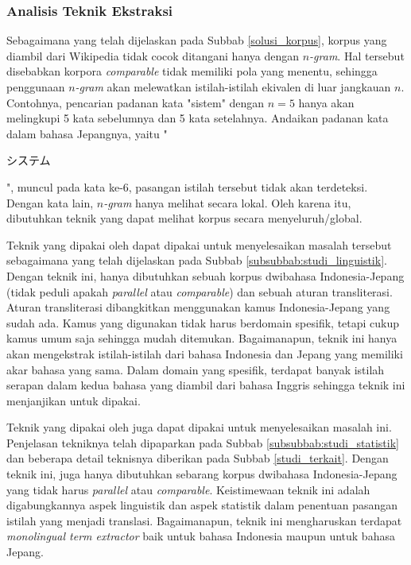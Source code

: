 \documentclass[../main/main.tex]{subfiles}
\begin{document}
\subsubsection{Analisis Teknik Ekstraksi}
Sebagaimana yang telah dijelaskan pada Subbab \ref{solusi_korpus}, korpus yang diambil dari Wikipedia tidak cocok ditangani hanya dengan \textit{$n$-gram}. Hal tersebut disebabkan korpora \textit{comparable} tidak memiliki pola yang menentu, sehingga penggunaan \textit{$n$-gram} akan melewatkan istilah-istilah ekivalen di luar jangkauan $n$. Contohnya, pencarian padanan kata "sistem" dengan $n=5$ hanya akan melingkupi 5 kata sebelumnya dan 5 kata setelahnya. Andaikan padanan kata dalam bahasa Jepangnya, yaitu "\begin{CJK}{UTF8}{min}システム\end{CJK}", muncul pada kata ke-6, pasangan istilah tersebut tidak akan terdeteksi. Dengan kata lain, \textit{$n$-gram} hanya melihat secara lokal. Oleh karena itu, dibutuhkan teknik yang dapat melihat korpus secara menyeluruh/global.

Teknik yang dipakai oleh \textcite{tsuji} dapat dipakai untuk menyelesaikan masalah tersebut sebagaimana yang telah dijelaskan pada Subbab \ref{subsubbab:studi_linguistik}. Dengan teknik ini, hanya dibutuhkan sebuah korpus dwibahasa Indonesia-Jepang (tidak peduli apakah \textit{parallel} atau \textit{comparable}) dan sebuah aturan transliterasi. Aturan transliterasi dibangkitkan menggunakan kamus Indonesia-Jepang yang sudah ada. Kamus yang digunakan tidak harus berdomain spesifik, tetapi cukup kamus umum saja sehingga mudah ditemukan. Bagaimanapun, teknik ini hanya akan mengekstrak istilah-istilah dari bahasa Indonesia dan Jepang yang memiliki akar bahasa yang sama. Dalam domain yang spesifik, terdapat banyak istilah serapan dalam kedua bahasa yang diambil dari bahasa Inggris sehingga teknik ini menjanjikan untuk dipakai.

Teknik yang dipakai oleh \textcite{aker} juga dapat dipakai untuk menyelesaikan masalah ini. Penjelasan tekniknya telah dipaparkan pada Subbab \ref{subsubbab:studi_statistik} dan beberapa detail teknisnya diberikan pada Subbab \ref{studi_terkait}. Dengan teknik ini, juga hanya dibutuhkan sebarang korpus dwibahasa Indonesia-Jepang yang tidak harus \textit{parallel} atau \textit{comparable}. Keistimewaan teknik ini adalah digabungkannya aspek linguistik dan aspek statistik dalam penentuan pasangan istilah yang menjadi translasi. Bagaimanapun, teknik ini mengharuskan terdapat \textit{monolingual term extractor} baik untuk bahasa Indonesia maupun untuk bahasa Jepang.
\end{document}
